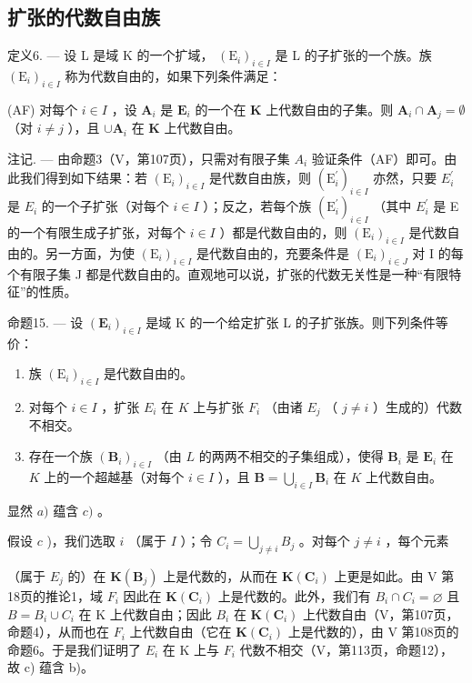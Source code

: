 \subsection{扩张的代数自由族}

定义6. --- 设 L 是域 K 的一个扩域， \((\mathrm{E}_{i})_{i\in I}\) 是 L 的子扩张的一个族。族 \((\mathrm{E}_{i})_{i\in I}\) 称为代数自由的，如果下列条件满足：

(AF) 对每个 \(i \in I\) ，设 \(\mathbf{A}_i\) 是 \(\mathbf{E}_i\) 的一个在 \(\mathbf{K}\) 上代数自由的子集。则 \(\mathbf{A}_i \cap \mathbf{A}_j = \emptyset\) （对 \(i \neq j\) ），且 \(\cup \mathbf{A}_i\) 在 \(\mathbf{K}\) 上代数自由。

注记. --- 由命题3（V，第107页），只需对有限子集 \(A_{i}\) 验证条件（AF）即可。由此我们得到如下结果：若 \((\mathrm{E}_{i})_{i\in I}\) 是代数自由族，则 \((\mathrm{E}_{i}^{\prime})_{i\in I}\) 亦然，只要 \(E_{i}^{\prime}\) 是 \(E_{i}\) 的一个子扩张（对每个 \(i\in I\) ）；反之，若每个族 \((\mathrm{E}_{i}^{\prime})_{i\in I}\) （其中 \(E_{i}^{\prime}\) 是 E 的一个有限生成子扩张，对每个 \(i\in I\) ）都是代数自由的，则 \((\mathrm{E}_{i})_{i\in I}\) 是代数自由的。另一方面，为使 \((\mathrm{E}_{i})_{i\in I}\) 是代数自由的，充要条件是 \((\mathrm{E}_{i})_{i\in J}\) 对 I 的每个有限子集 J 都是代数自由的。直观地可以说，扩张的代数无关性是一种“有限特征”的性质。

命题15. --- 设 \((\mathbf{E}_i)_{i\in I}\) 是域 K 的一个给定扩张 L 的子扩张族。则下列条件等价：

\begin{enumerate}
\def\labelenumi{\alph{enumi})}
\item
  族 \((\mathrm{E}_i)_{i\in I}\) 是代数自由的。
\item
  对每个 \(i \in I\) ，扩张 \(E_i\) 在 \(K\) 上与扩张 \(F_i\) （由诸 \(E_j\) （ \(j \neq i\) ）生成的）代数不相交。
\item
  存在一个族 \((\mathbf{B}_i)_{i\in I}\) （由 \(L\) 的两两不相交的子集组成），使得 \(\mathbf{B}_i\) 是 \(\mathbf{E}_i\) 在 \(K\) 上的一个超越基（对每个 \(i\in I\) ），且 \(\mathbf{B} = \bigcup_{i\in I}\mathbf{B}_i\) 在 \(K\) 上代数自由。
\end{enumerate}

显然 \(a)\) 蕴含 \(c)\) 。

假设 \(c\) )，我们选取 \(i\) （属于 \(I\) ）；令 \(C_i = \bigcup_{j \neq i} B_j\) 。对每个 \(j \neq i\) ，每个元素

（属于 \(E_{j}\) 的）在 \(\mathbf{K}(\mathbf{B}_{j})\) 上是代数的，从而在 \(\mathbf{K}(\mathbf{C}_{i})\) 上更是如此。由 V 第18页的推论1，域 \(F_{i}\) 因此在 \(\mathbf{K}(\mathbf{C}_{i})\) 上是代数的。此外，我们有 \(B_{i} \cap C_{i} = \varnothing\) 且 \(B = B_{i} \cup C_{i}\) 在 K 上代数自由；因此 \(B_{i}\) 在 \(\mathbf{K}(\mathbf{C}_{i})\) 上代数自由（V，第107页，命题4），从而也在 \(F_{i}\) 上代数自由（它在 \(\mathbf{K}(\mathbf{C}_{i})\) 上是代数的），由 V 第108页的命题6。于是我们证明了 \(E_{i}\) 在 K 上与 \(F_{i}\) 代数不相交（V，第113页，命题12），故 c) 蕴含 b)。

